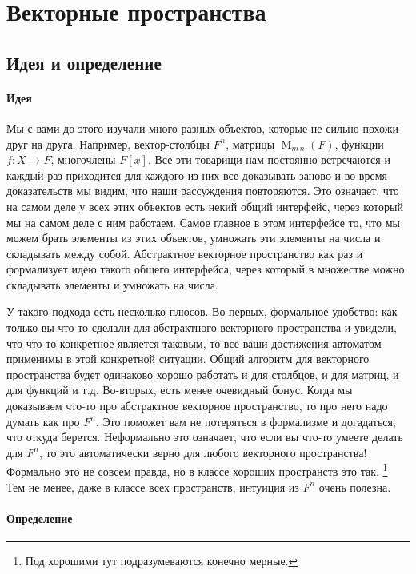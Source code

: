 \newpage
\section{Векторные пространства}

\subsection{Идея и определение}

\paragraph{Идея}

Мы с вами до этого изучали много разных объектов, которые не сильно похожи друг на друга.
Например, вектор-столбцы $F^n$, матрицы $\operatorname{M}_{m\,n}(F)$, функции $f\colon X\to F$, многочлены $F[x]$.
Все эти товарищи нам постоянно встречаются и каждый раз приходится для каждого из них все доказывать заново и во время доказательств мы видим, что наши рассуждения повторяются.
Это означает, что на самом деле у всех этих объектов есть некий общий интерфейс, через который мы на самом деле с ним работаем.
Самое главное в этом интерфейсе то, что мы можем брать элементы из этих объектов, умножать эти элементы на числа и складывать между собой.
Абстрактное векторное пространство как раз и формализует идею такого общего интерфейса, через который в множестве можно складывать элементы и умножать на числа.


У такого подхода есть несколько плюсов.
Во-первых, формальное удобство: как только вы что-то сделали для абстрактного векторного пространства и увидели, что что-то конкретное является таковым, то все ваши достижения автоматом применимы в этой конкретной ситуации.
Общий алгоритм для векторного пространства будет одинаково хорошо работать и для столбцов, и для матриц, и для функций и т.д.
Во-вторых, есть менее очевидный бонус.
Когда мы доказываем что-то про абстрактное векторное пространство, то про него надо думать как про $F^n$.
Это поможет вам не потеряться в формализме и догадаться, что откуда берется.
Неформально это означает, что если вы что-то умеете делать для $F^n$, то это автоматически верно для любого векторного пространства!
Формально это не совсем правда, но в классе хороших пространств это так.%
\footnote{Под хорошими тут подразумеваются конечно мерные.}
Тем не менее, даже в классе всех пространств, интуиция из $F^n$ очень полезна.


\paragraph{Определение}

